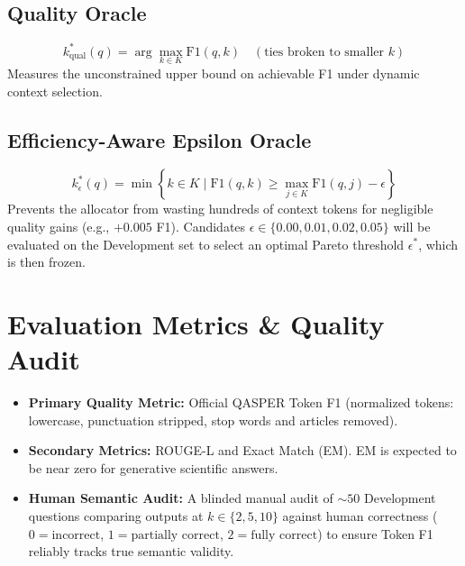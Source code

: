 \documentclass[11pt,a4paper]{article}
\begin{document}
\subsection{Quality Oracle}
\begin{equation}
k^*_{\text{qual}}(q) = \arg\max_{k \in K} \text{F1}(q, k) \quad (\text{ties broken to smaller } k)
\end{equation}
Measures the unconstrained upper bound on achievable F1 under dynamic context selection.

\subsection{Efficiency-Aware Epsilon Oracle}
\begin{equation}
k^*_{\epsilon}(q) = \min \left\{ k \in K \;\Big|\; \text{F1}(q, k) \ge \max_{j \in K} \text{F1}(q, j) - \epsilon \right\}
\end{equation}
Prevents the allocator from wasting hundreds of context tokens for negligible quality gains (e.g., $+0.005$ F1). Candidates $\epsilon \in \{0.00, 0.01, 0.02, 0.05\}$ will be evaluated on the Development set to select an optimal Pareto threshold $\epsilon^*$, which is then frozen.

\section{Evaluation Metrics \& Quality Audit}
\begin{itemize}
    \item \textbf{Primary Quality Metric:} Official QASPER Token F1 (normalized tokens: lowercase, punctuation stripped, stop words and articles removed).
    \item \textbf{Secondary Metrics:} ROUGE-L and Exact Match (EM). EM is expected to be near zero for generative scientific answers.
    \item \textbf{Human Semantic Audit:} A blinded manual audit of $\sim 50$ Development questions comparing outputs at $k \in \{2, 5, 10\}$ against human correctness ($0 = \text{incorrect}$, $1 = \text{partially correct}$, $2 = \text{fully correct}$) to ensure Token F1 reliably tracks true semantic validity.
\end{itemize}
\end{document}
